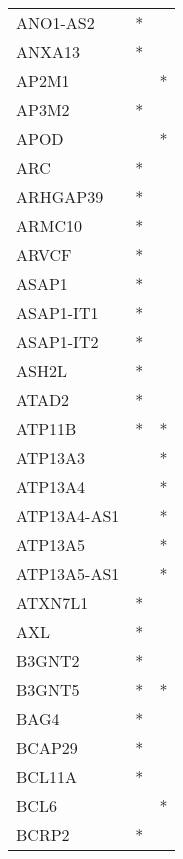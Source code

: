 \begin{longtable}{lcc}
ANO1-AS2         &              * &            \\
ANXA13           &              * &            \\
AP2M1            &                &          * \\
AP3M2            &              * &            \\
APOD             &                &          * \\
ARC              &              * &            \\
ARHGAP39         &              * &            \\
ARMC10           &              * &            \\
ARVCF            &              * &            \\
ASAP1            &              * &            \\
ASAP1-IT1        &              * &            \\
ASAP1-IT2        &              * &            \\
ASH2L            &              * &            \\
ATAD2            &              * &            \\
ATP11B           &              * &          * \\
ATP13A3          &                &          * \\
ATP13A4          &                &          * \\
ATP13A4-AS1      &                &          * \\
ATP13A5          &                &          * \\
ATP13A5-AS1      &                &          * \\
ATXN7L1          &              * &            \\
AXL              &              * &            \\
B3GNT2           &              * &            \\
B3GNT5           &              * &          * \\
BAG4             &              * &            \\
BCAP29           &              * &            \\
BCL11A           &              * &            \\
BCL6             &                &          * \\
BCRP2            &              * &            \\

\end{longtable}
